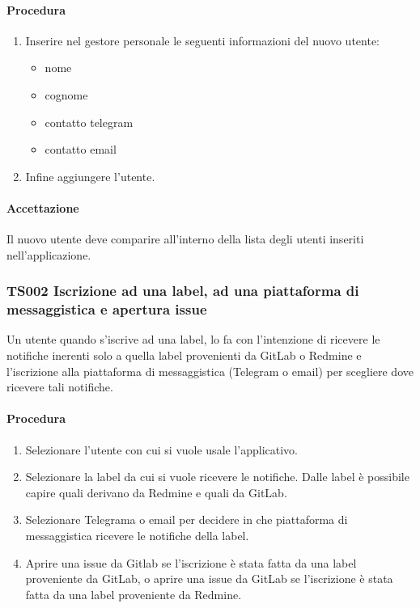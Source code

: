 		\paragraph*{Procedura}
			\begin{enumerate}
				\item Inserire nel gestore personale le seguenti informazioni del nuovo utente:
				\begin{itemize}
					\item nome
					\item cognome
					\item contatto telegram
					\item contatto email
				\end{itemize}
				
				\item Infine aggiungere l'utente.
			\end{enumerate}
	
		\paragraph*{Accettazione}
		Il nuovo utente deve comparire all'interno della lista degli utenti inseriti nell'applicazione.
	
	\subsubsection{TS002 Iscrizione ad una label, ad una piattaforma di messaggistica e apertura issue}
		Un utente quando s'iscrive ad una label, lo fa con l'intenzione di ricevere le notifiche inerenti solo a quella label provenienti da GitLab o Redmine e l'iscrizione alla piattaforma di messaggistica (Telegram o email) per scegliere dove ricevere tali notifiche.
		
		\paragraph*{Procedura}
			\begin{enumerate}
				\item Selezionare l'utente con cui si vuole usale l'applicativo.
				\item Selezionare la label da cui si vuole ricevere le notifiche. Dalle label è possibile capire quali derivano da Redmine e quali da GitLab.
				\item Selezionare Telegrama o email per decidere in che piattaforma di messaggistica ricevere le notifiche della label.
				\item Aprire una issue da Gitlab se l'iscrizione è stata fatta da una label proveniente da GitLab, o aprire una issue da GitLab se l'iscrizione è stata fatta da una label proveniente da Redmine.
			\end{enumerate}
		
